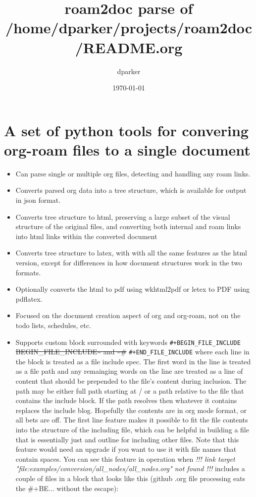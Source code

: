 \documentclass[11pt]{article}
\author{dparker}
\date{\today}
\title{roam2doc parse of /home/dparker/projects/roam2doc/README.org}
\begin{document}
\maketitle
\tableofcontents
\clearpage
\section{A set of python tools for convering org-roam files to a single document  }
 \label{obj-3}
 \label{obj-2}
\begin{itemize}
\item
Can parse single or multiple org files, detecting and handling any roam links.
\item
Converts parsed org data into a tree structure, which is available for output in json format.
\item
Converts tree structure to html, preserving a large subset of the visual structure of
   the original files, and converting both internal and roam links into html links within
   the converted document

\item
Converts tree structure to latex, with with all the same features as the html version, except
   for differences in how document structures work in the two formats.

\item
Optionally converts the html to pdf using wkhtml2pdf or letex to PDF using pdflatex.
\item
Focused on the document creation aspect of org and org-roam, not on the todo lists, schedules, etc.
\item
Supports custom block surrounded with keywords
\texttt{\#+BEGIN\_FILE\_INCLUDE}
\sout{BEGIN\_FILE\_INCLUDE\textasciitilde{} and \textasciitilde{}\#}
\texttt{\#+END\_FILE\_INCLUDE}
  where each line in the block is treated as a file include spec. The first word in the line is
  treated as a file path and any remainging words on the line are treated
  as a line of content that should be prepended to the file's content during inclusion. The path
  may be  either full path starting at / or a path relative to the file that contains the include block.
  If the path resolves then whatever it
  contains replaces the include blog. Hopefully the contents are in org mode format, or all bets are off.
  The first line feature makes it
  possible to fit the file contents into the structure of the including file, which can be helpful
  in building a file that is essentially just and outline for including other files. Note that
  this feature would need an upgrade if you want to use it with file names that contain spaces.
  You can see this feature in operation when
\textit{!!! link target "file:examples/conversion/all\_nodes/all\_nodes.org" not found !!!}
includes a couple
  of files in a block that looks like this (github .org file processing eats the \#+BE... without the escape):


\end{itemize}
\end{document}
